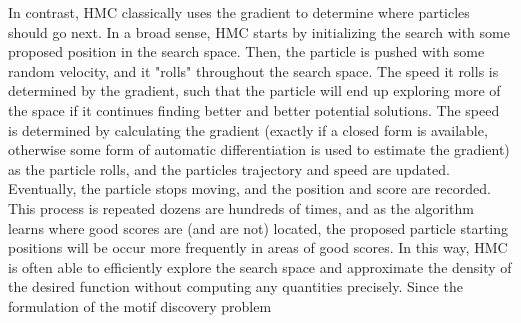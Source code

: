 \documentclass{article}
\begin{document}
  In contrast, HMC classically uses the gradient to determine where particles should go next. In a broad sense, HMC starts by initializing the search with some proposed position in the search space. Then, the particle is pushed with some random velocity, and it "rolls" throughout the search space. The speed it rolls is determined by the gradient, such that the particle will end up exploring more of the space if it continues finding better and better potential solutions. The speed is determined by calculating the gradient (exactly if a closed form is available, otherwise some form of automatic differentiation is used to estimate the gradient) as the particle rolls, and the particles trajectory and speed are updated. Eventually, the particle stops moving, and the position and score are recorded. This process is repeated dozens are hundreds of times, and as the algorithm learns where good scores are (and are not) located, the proposed particle starting positions will be occur more frequently in areas of good scores. In this way, HMC is often able to efficiently explore the search space and approximate the density of the desired function without computing any quantities precisely. Since the formulation of the motif discovery problem 
\end{document}
